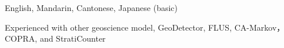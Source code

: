 

\begin{cvskills}


    {English, Mandarin, Cantonese, Japanese (basic)}

    { Experienced with other geoscience model, GeoDetector, FLUS, CA-Markov，COPRA, and StratiCounter }


\end{cvskills}
